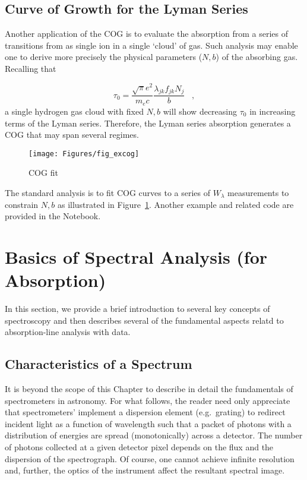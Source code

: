\documentclass[graybox]{svmult}
\def\cmma{\;\;\; ,}
\begin{document}
\subsection{Curve of Growth for the Lyman Series}

Another application of the COG is to evaluate the
absorption from a series of transitions from as 
single ion in a single `cloud' of gas.
Such analysis may enable one to derive more precisely
the physical parameters ($N,b$) of the absorbing gas.
Recalling that 

\begin{equation}
\tau_0 = \frac{\sqrt{\pi} e^2}{m_e c} \frac{\lambda_{jk} f_{jk} N_j}{b} \cmma
\end{equation}
a single hydrogen gas cloud with fixed $N,b$ will
show decreasing $\tau_0$ in increasing terms of the
Lyman series. Therefore, the Lyman series absorption 
generates a COG that may span several regimes.

%
\begin{figure}[b]
\sidecaption
\texttt{[image: Figures/fig\_excog]}
%
%
\caption{COG fit
}
\label{fig:COGfit}       %
\end{figure}


The standard analysis is to fit COG curves to a
series of $W_\lambda$ measurements to constrain $N,b$
as illustrated in Figure~\ref{fig:COGfit}.
Another example and related code are provided in the
Notebook.


\section{Basics of Spectral Analysis (for Absorption)}
\label{sec:specanaly}

In this section, we provide a brief introduction to 
several key concepts of spectroscopy and then describes
several of the fundamental aspects relatd to absorption-line
analysis with data.

\subsection{Characteristics of a Spectrum}

It is beyond the scope of this Chapter to describe in detail the
fundamentals of spectrometers in astronomy.  For what follows,
the reader need only appreciate that spectrometers' implement
a dispersion element (e.g.\ grating) to redirect incident light 
as a function of wavelength such that a packet of photons with
a distribution of energies are spread (monotonically) across a detector.
The number of photons collected at a given detector pixel depends
on the flux and the dispersion of the spectrograph.
Of course, one cannot achieve infinite resolution and, further, the
optics of the instrument affect the resultant spectral image.
\end{document}
